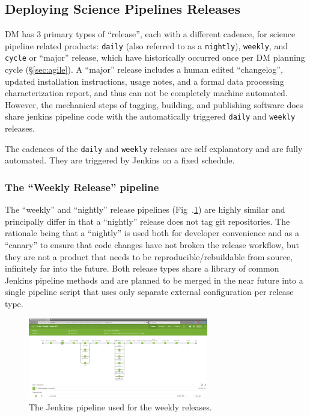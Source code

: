 \subsection{Deploying Science Pipelines Releases}
\label{sec:scipipe-deploy}

DM has 3 primary types of ``release'', each with a different cadence, for
science pipeline related products: \texttt{daily} (also referred to as a \texttt{nightly}), \texttt{weekly}, and \texttt{cycle} or ``major'' release, which have historically occurred once per DM planning cycle (\S\ref{sec:agile}).
A ``major'' release includes a human edited ``changelog'', updated installation
instructions, usage notes, and a formal data processing characterization report,
and thus can not be completely machine automated.  However, the
mechanical steps of tagging, building, and publishing software does share
jenkins pipeline code with the automatically triggered \texttt{daily} and
\texttt{weekly} releases.

The cadences of the \texttt{daily} and \texttt{weekly} releases are self
explanatory and are fully automated. They are triggered by Jenkins on a fixed
schedule.

\subsubsection{The ``Weekly Release'' pipeline}
\label{sec:releases_weekly}
\label{sec:releases_daily}

The ``weekly'' and ``nightly'' release pipelines (Fig~.\ref{fig:weekly-pipeline}) are highly similar and
principally differ in that a ``nightly'' release does not tag git
repositories.  The rationale being that a ``nightly'' is used both for
developer convenience and as a ``canary'' to ensure that code changes have not
broken the release workflow, but they are not a product that needs to be
reproducible/rebuildable from source, infinitely far into the future.  Both
release types share a library of common Jenkins pipeline methods and are
planned to be merged in the near future into a single pipeline script that uses
only separate external configuration per release type.

\begin{figure}[t]
\begin{center}
\includegraphics[width=0.7\textwidth]{pipelinedeploy-weekly-release}
\caption{The Jenkins pipeline used for the weekly releases.
\label{fig:weekly-pipeline}}
\end{center}
\end{figure}


